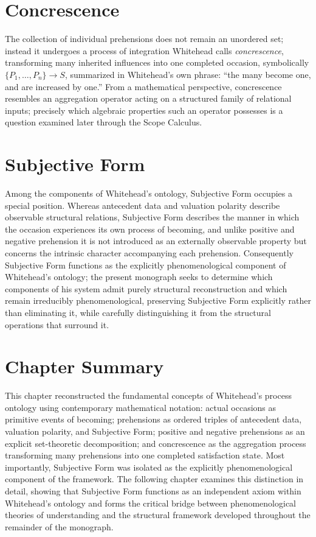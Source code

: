 \documentclass[11pt,twoside,openright]{book}
\numberwithin{equation}{chapter}
\theoremstyle{definition}
\theoremstyle{plain}
\theoremstyle{remark}
\theoremstyle{definition}
\newcommand{\WSatisfaction}{S}
\begin{document}
\section{Concrescence}

The collection of individual prehensions does not remain an unordered
set; instead it undergoes a process of integration Whitehead calls
\emph{concrescence}, transforming many inherited influences into one
completed occasion, symbolically
$\{P_1,\ldots,P_n\}\longrightarrow \WSatisfaction$, summarized in
Whitehead's own phrase: ``the many become one, and are increased by
one.'' From a mathematical perspective, concrescence resembles an
aggregation operator acting on a structured family of relational inputs;
precisely which algebraic properties such an operator possesses is a
question examined later through the Scope Calculus.

\section{Subjective Form}

Among the components of Whitehead's ontology, Subjective Form occupies a
special position. Whereas antecedent data and valuation polarity describe
observable structural relations, Subjective Form describes the manner in
which the occasion experiences its own process of becoming, and unlike
positive and negative prehension it is not introduced as an externally
observable property but concerns the intrinsic character accompanying
each prehension. Consequently Subjective Form functions as the explicitly
phenomenological component of Whitehead's ontology; the present monograph
seeks to determine which components of his system admit purely structural
reconstruction and which remain irreducibly phenomenological, preserving
Subjective Form explicitly rather than eliminating it, while carefully
distinguishing it from the structural operations that surround it.

\section{Chapter Summary}

This chapter reconstructed the fundamental concepts of Whitehead's
process ontology using contemporary mathematical notation: actual
occasions as primitive events of becoming; prehensions as ordered
triples of antecedent data, valuation polarity, and Subjective Form;
positive and negative prehensions as an explicit set-theoretic
decomposition; and concrescence as the aggregation process transforming
many prehensions into one completed satisfaction state. Most importantly,
Subjective Form was isolated as the explicitly phenomenological component
of the framework. The following chapter examines this distinction in
detail, showing that Subjective Form functions as an independent axiom
within Whitehead's ontology and forms the critical bridge between
phenomenological theories of understanding and the structural framework
developed throughout the remainder of the monograph.
\end{document}
